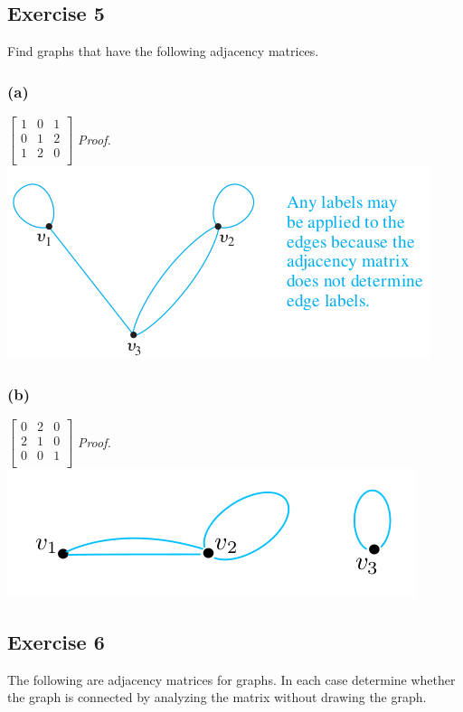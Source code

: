 \documentclass[14pt]{extarticle}
\begin{document}
\subsection{Exercise 5}
Find graphs that have the following adjacency matrices.

\subsubsection{(a)}
\(
\left[ 
\begin{array}{ccc}
1 & 0 & 1 \\
0 & 1 & 2 \\
1 & 2 & 0 \\
\end{array}
\right]
\)
{\it Proof.} \includegraphics[scale=0.6]{../images/10.2.5.a.png}

\subsubsection{(b)}
\(
\left[ 
\begin{array}{ccc}
0 & 2 & 0 \\
2 & 1 & 0 \\
0 & 0 & 1 \\
\end{array}
\right]
\)
{\it Proof.} \includegraphics[scale=0.6]{../images/10.2.5.b.png}

\subsection{Exercise 6}
The following are adjacency matrices for graphs. In each case determine whether the graph is connected by analyzing the 
matrix without drawing the graph.
\end{document}
